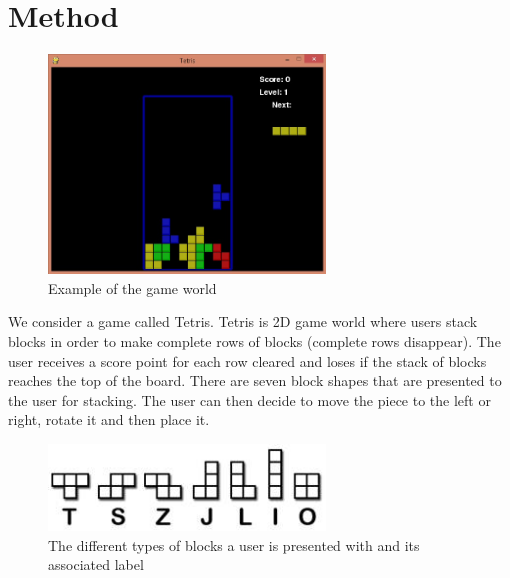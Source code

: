 \documentclass[11pt, conference, compsoc]{IEEEtran}
\let\MYoriglatexcaption\caption
\renewcommand{\caption}[2][\relax]{\MYoriglatexcaption[#2]{#2}}
\begin{document}
\section{Method}

\begin{figure}[!h]
	\centering
	\includegraphics[width=2.9in]{board.jpg}
	\caption{Example of the game world}
	\label{Figure 1}
\end{figure}
\FloatBarrier

We consider a game called Tetris. Tetris is 2D game world where users stack blocks in order to make complete rows of blocks (complete rows disappear). The user receives a score point for each row cleared and loses if the stack of blocks reaches the top of the board. There are seven block shapes that are presented to the user for stacking.
The user can then decide to move the piece to the left or right, rotate it and then place it. 

\FloatBarrier
\begin{figure}[!h]
	\centering
	\includegraphics[width=2.9in]{blocks.jpg}
	\caption{The different types of blocks a user is presented with and its associated label}
	\label{Figure 2}
\end{figure}
\FloatBarrier
\end{document}
